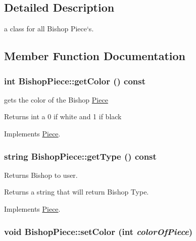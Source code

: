 \subsection{Detailed Description}
a class for all Bishop Piece`s. 

\subsection{Member Function Documentation}
\hypertarget{classBishopPiece_ae40042d8edb9172b97955a1a3d651434}{
\subsubsection[{getColor}]{\setlength{\rightskip}{0pt plus 5cm}int BishopPiece::getColor () const}}
\label{classBishopPiece_ae40042d8edb9172b97955a1a3d651434}


gets the color of the Bishop \hyperlink{classPiece}{Piece} \begin{DoxyReturn}{Returns}
int a 0 if white and 1 if black 
\end{DoxyReturn}


Implements \hyperlink{classPiece_a1376072d4815719e60253ce5688df95c}{Piece}.\hypertarget{classBishopPiece_af651439e984e4d28955db75da601b35b}{
\subsubsection[{getType}]{\setlength{\rightskip}{0pt plus 5cm}string BishopPiece::getType () const}}
\label{classBishopPiece_af651439e984e4d28955db75da601b35b}


Returns Bishop to user. \begin{DoxyReturn}{Returns}
a string that will return Bishop Type. 
\end{DoxyReturn}


Implements \hyperlink{classPiece_a5b88fcd786bb30b345b24fbc3ab24ab9}{Piece}.\hypertarget{classBishopPiece_ae75166e3d3bc71f3030268158cba4054}{
\subsubsection[{setColor}]{\setlength{\rightskip}{0pt plus 5cm}void BishopPiece::setColor (int {\em colorOfPiece})}}
\label{classBishopPiece_ae75166e3d3bc71f3030268158cba4054}


